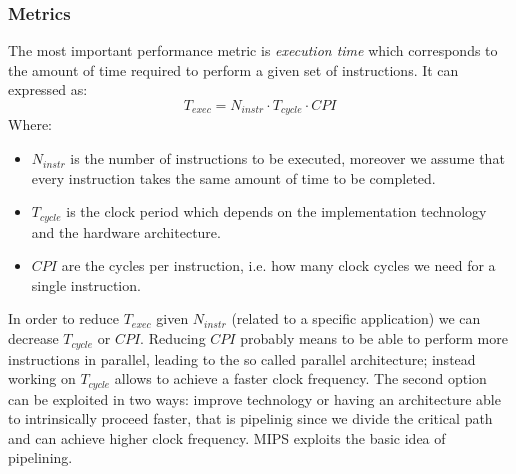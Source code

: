 \subsubsection{Metrics}
The most important performance metric is \textit{execution time} which
corresponds to the amount of time required to perform a given set of
instructions. It can expressed as:
\begin{equation*}
T_{exec}= N_{instr} \cdot T_{cycle} \cdot CPI
\end{equation*}
Where:
\begin{itemize}
  \item $N_{instr}$ is the number of instructions to be executed, moreover we
    assume that every instruction takes the same amount of time to be completed.
  \item $T_{cycle}$ is the clock period which depends on the implementation
    technology and the hardware architecture.
  \item $CPI$ are the cycles per instruction, i.e. how many clock cycles we
    need for a single instruction.
\end{itemize}
In order to reduce $T_{exec}$ given $N_{instr}$ (related to a specific
application) we can decrease $T_{cycle}$ or $CPI$. Reducing $CPI$ probably means
to be able to perform more instructions in parallel, leading to the so called
parallel architecture; instead working on $T_{cycle}$ allows to achieve a faster
clock frequency. The second option can be exploited in two ways: improve
technology or having an architecture able to intrinsically proceed faster, that
is pipelinig since we divide the critical path and can achieve higher clock
frequency. MIPS exploits the basic idea of pipelining.
